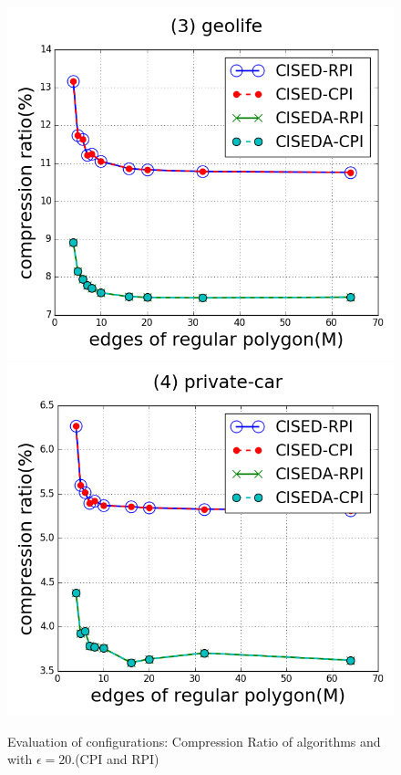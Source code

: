 \begin{figure}[tb!]
\includegraphics[scale = 0.250]{figures/Exp-M-e-20-CR-geolife.png}
\includegraphics[scale = 0.250]{figures/Exp-M-e-20-CR-private.png}
\vspace{-2ex}
\caption{\small Evaluation of configurations: Compression Ratio of algorithms \cist and \cista with $\epsilon = 20$.(CPI and RPI)}
\label{fig:m-cr-e20}
\vspace{-1ex}
\end{figure}

